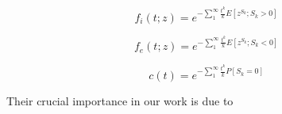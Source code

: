 $$f_i(t;z) = e^{-\sum_{1}^{\infty} \frac{t^k}{k} E[z^{S_k}; S_k > 0]}$$

$$f_e(t;z) = e^{-\sum_{1}^{\infty} \frac{t^k}{k} E[z^{S_k}; S_k < 0]}$$

$$c(t) = e^{-\sum_{1}^{\infty} \frac{t^k}{k} P[S_k = 0]}$$

Their crucial importance in our work is due to
